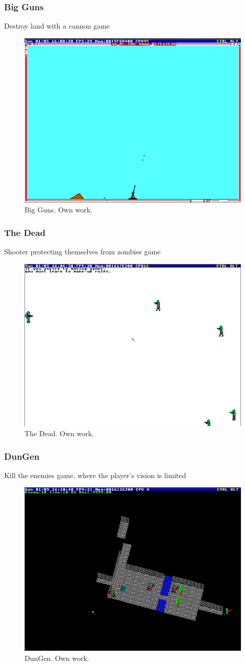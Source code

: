 \documentclass{beamer}
\begin{document}
	\begin{frame}
		\frametitle{Big Guns}
		Destroy land with a cannon game
		\begin{figure}
			\centering
			\includegraphics[width=0.6\linewidth]{images/big_guns.png}
			\caption{Big Guns. Own work.}
			\label{fig:big_guns}
		\end{figure}
	\end{frame}

	\begin{frame}
		\frametitle{The Dead}
		Shooter protecting themselves from zombies game
		\begin{figure}
			\centering
			\includegraphics[width=0.6\linewidth]{images/the_dead.png}
			\caption{The Dead. Own work.}
			\label{fig:the_dead}
		\end{figure}
	\end{frame}

	\begin{frame}
		\frametitle{DunGen}
		Kill the enemies game, where the player's vision is limited
		\begin{figure}
			\centering
			\includegraphics[width=0.6\linewidth]{images/dungen.png}
			\caption{DunGen. Own work.}
			\label{fig:dungen}
		\end{figure}
	\end{frame}
\end{document}

